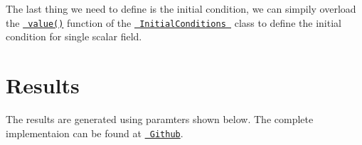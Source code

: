  The last thing we need to define is the initial condition, we can simpily overload the \href{../html/class_initial_conditions.html\#a369cea7ba74f8cd0a6ca12e0c164ff74}{\texttt{ value()}} function of the \href{../html/class_initial_conditions.html}{\texttt{ Initial\+Conditions }} class to define the initial condition for single scalar field. 
\begin{DoxyCode}{0}
\DoxyCodeLine{\}}
\end{DoxyCode}
\hypertarget{growth_results}{}\section{Results}\label{growth_results}
 

The results are generated using paramters shown below. The complete implementaion can be found at \href{https://github.com/mechanoChem/mechanoChemFEM/tree/example/Example3_Allen-Cahn}{\texttt{ Github}}.


